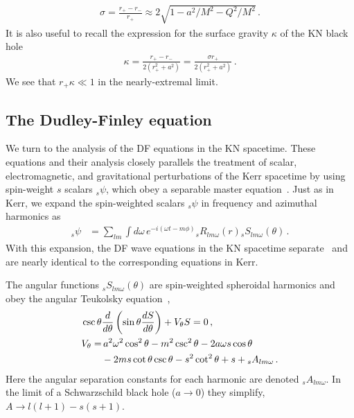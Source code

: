 \begin{refsection}
\begin{align}
\sigma = \frac{r_+ - r_-}{r_+} \approx 2 \sqrt{1 - a^2/M^2 - Q^2/M^2} \,.
\end{align}
It is also useful to recall the expression for the surface gravity $\kappa$ of the KN black hole~\cite{Wald1984}
\begin{align}
\kappa = \frac{r_+ - r_-}{2(r_+^2 +a^2)} = \frac{\sigma r_+}{2(r_+^2 +a^2)} \,.
\end{align}
We see that $r_+ \kappa \ll 1$ in the nearly-extremal limit.

\subsection{The Dudley-Finley equation}

We turn to the analysis of the DF equations in the KN spacetime. 
These equations and their analysis closely parallels the treatment of scalar, electromagnetic, and gravitational perturbations of the Kerr spacetime by using spin-weight $s$ scalars ${}_s \psi$, which obey a separable master equation~\cite{Teukolsky1973}.
Just as in Kerr, we expand the spin-weighted scalars ${}_s \psi$ in frequency and azimuthal harmonics as
\begin{align}
{}_s \psi & = \sum_{lm} \int d\omega \, e^{-i(\omega t - m \phi)} {}_s R_{lm\omega}(r) {}_sS_{lm\omega}(\theta) \,.
\end{align}
With this expansion, the DF wave equations in the KN spacetime separate~\cite{Kokkotas:1993ef} and are nearly identical to the corresponding equations in Kerr.

The angular functions $ {}_sS_{lm\omega}(\theta)$ are spin-weighted spheroidal harmonics and obey the angular Teukolsky equation~\cite{Teukolsky1973,Fackerell1977,Berti2009}, 
\begin{align}
\label{eq:TeukS}
\csc \theta & \frac{d}{d\theta} \left( \sin \theta  \frac{dS}{d\theta}\right) + V_\theta S = 0 \,, \\
V_\theta = & \, a^2 \omega^2 \cos^2 \theta - m^2 \csc^2 \theta - 2 a \omega s \cos \theta \notag  \\ &
- 2 m s \cot \theta \csc \theta -s^2 \cot^2 \theta + s + {}_s A_{lm \omega} \,.
\end{align} 
Here the angular separation constants for each harmonic are denoted ${}_s A_{lm\omega}$.
In the limit of a Schwarzschild black hole ($a \to 0$) they simplify, $A \to l(l+1) - s(s+1)$.


\end{refsection}
